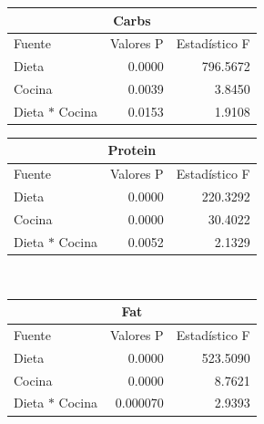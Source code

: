 \documentclass[12pt,a4paper]{article}
\begin{document}
{{            \begin{center}
                \begin{tabular}{lrr}
                \toprule
                    \multicolumn{3}{c}{Carbs} \\
                \midrule
                    Fuente & Valores P & Estadístico F \\
                \midrule
                    Dieta               & 0.0000 & 796.5672 \\
                    Cocina              & 0.0039 &   3.8450 \\
                    Dieta $\ast$ Cocina & 0.0153 &   1.9108 \\
                \bottomrule
                \end{tabular}
                \vspace*{0.5cm}
                \begin{tabular}{lrr}
                    \toprule
                    \multicolumn{3}{c}{Protein} \\
                \midrule
                    Fuente & Valores P & Estadístico F \\
                \midrule
                    Dieta               & 0.0000 & 220.3292 \\
                    Cocina              & 0.0000 &  30.4022 \\
                    Dieta $\ast$ Cocina & 0.0052 &   2.1329 \\
                \bottomrule
                \end{tabular}\\
                \vspace*{0.1cm}
                \begin{tabular}{lrr}
                    \toprule
                    \multicolumn{3}{c}{Fat} \\
                \midrule
                    Fuente & Valores P & Estadístico F \\
                \midrule
                    Dieta               & 0.0000   & 523.5090 \\
                    Cocina              & 0.0000   &   8.7621 \\
                    Dieta $\ast$ Cocina & 0.000070 &   2.9393 \\
                \bottomrule
                \end{tabular}
            \end{center}

}}
\end{document}

